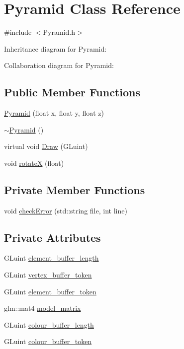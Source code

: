 \hypertarget{class_pyramid}{}\section{Pyramid Class Reference}
\label{class_pyramid}


{\ttfamily \#include $<$Pyramid.\+h$>$}



Inheritance diagram for Pyramid\+:


Collaboration diagram for Pyramid\+:
\subsection*{Public Member Functions}
\begin{DoxyCompactItemize}
\item 
\hyperlink{class_pyramid_ac2fb5fcb7eeae3b952e3c097c7c9647b}{Pyramid} (float x, float y, float z)
\item 
\hyperlink{class_pyramid_a815ce650e2be7f04a44a0424af0e208a}{$\sim$\+Pyramid} ()
\item 
virtual void \hyperlink{class_pyramid_a4205e8fa45cc315d4687cf6c06182082}{Draw} (G\+Luint)
\item 
void \hyperlink{class_pyramid_aa1422dc7a204d2cf3ac9e28dae2d00cf}{rotate\+X} (float)
\end{DoxyCompactItemize}
\subsection*{Private Member Functions}
\begin{DoxyCompactItemize}
\item 
void \hyperlink{class_pyramid_abedc6115d45aa811ebe6b6d93fa87958}{check\+Error} (std\+::string file, int line)
\end{DoxyCompactItemize}
\subsection*{Private Attributes}
\begin{DoxyCompactItemize}
\item 
G\+Luint \hyperlink{class_pyramid_a9692c05fe1796a90a4bf995bea95f7f2}{element\+\_\+buffer\+\_\+length}
\item 
G\+Luint \hyperlink{class_pyramid_a8e1f08dc7c85cabe71117b1c9b8ea987}{vertex\+\_\+buffer\+\_\+token}
\item 
G\+Luint \hyperlink{class_pyramid_a760ec3c4f40ea025e57f0f95d118a921}{element\+\_\+buffer\+\_\+token}
\item 
glm\+::mat4 \hyperlink{class_pyramid_a6c97c4bb0dd7e4f12e50edd8dcc1cce9}{model\+\_\+matrix}
\item 
G\+Luint \hyperlink{class_pyramid_add41d4b357644ea0dd2cbf5ad7ebf59b}{colour\+\_\+buffer\+\_\+length}
\item 
G\+Luint \hyperlink{class_pyramid_a20c19661fc7ece0b2122af63501a3f0c}{colour\+\_\+buffer\+\_\+token}
\end{DoxyCompactItemize}



